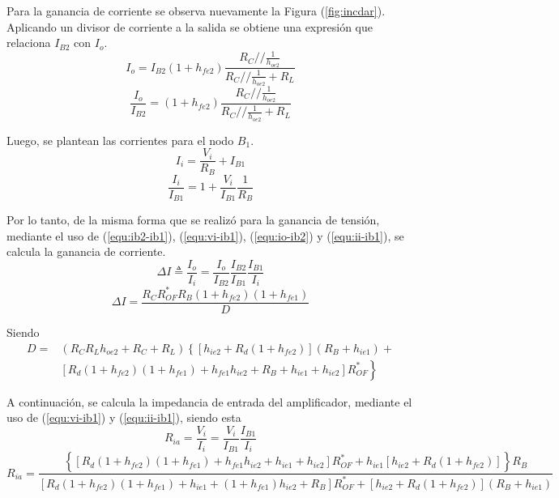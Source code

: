 Para la ganancia de corriente se observa nuevamente la Figura (\ref{fig:incdar}). Aplicando un divisor de corriente a la salida se obtiene una expresión que relaciona $I_{B2}$ con $I_o$.
\begin{equation*}
	I_o = I_{B2} \left( 1 + h_{fe2} \right) \frac{R_C // \frac{1}{h_{oe2}}}{R_C // \frac{1}{h_{oe2}} + R_L}
\end{equation*}
\begin{equation}
	\frac{I_o}{I_{B2}} = \left( 1 + h_{fe2} \right) \frac{R_C // \frac{1}{h_{oe2}}}{R_C // \frac{1}{h_{oe2}} + R_L}
	\label{equ:io-ib2}
\end{equation}

Luego, se plantean las corrientes para el nodo $B_1$.
\begin{equation*}
	I_i = \frac{V_i}{R_B} + I_{B1}
\end{equation*}
\begin{equation}
	\frac{I_i}{I_{B1}} = 1 + \frac{V_i}{I_{B1}} \frac{1}{R_B}
\label{equ:ii-ib1}
\end{equation}

Por lo tanto, de la misma forma que se realizó para la ganancia de tensión, mediante el uso de (\ref{equ:ib2-ib1}), (\ref{equ:vi-ib1}), (\ref{equ:io-ib2}) y (\ref{equ:ii-ib1}), se calcula la ganancia de corriente.
\begin{equation*}
	\Delta I \triangleq \frac{I_o}{I_i} = \frac{I_o}{I_{B2}} \frac{I_{B2}}{I_{B1}} \frac{I_{B1}}{I_i}
\end{equation*}
\begin{equation}
	\Delta I = \frac { R_C R_{OF}^* R_B \left( 1+h_{fe2} \right) \left( 1+h_{fe1} \right)}{D}
\end{equation}

Siendo
\begin{equation}
\begin{split}
D = & \left( R_C R_L h_{oe2}+R_C+R_L \right)  \left\lbrace \left[ h_{ie2} + R_d \left( 1+h_{fe2} \right) \right] \left( R_B+h_{ie1} \right) + \right. \\
& \left. \left[ R_d \left( 1+h_{fe2} \right)  \left( 1+h_{fe1} \right) + h_{fe1} h_{ie2} + R_B + h_{ie1} + h_{ie2} \right] R_{OF}^* \right\rbrace
\end{split}
\end{equation}

A continuación, se calcula la impedancia de entrada del amplificador, mediante el uso de (\ref{equ:vi-ib1}) y (\ref{equ:ii-ib1}), siendo esta
\begin{equation*}
	R_{ia} = \frac{V_i}{I_i} =  \frac{V_i}{I_{B1}}\frac{I_{B1}}{I_i}
\end{equation*}
\begin{equation}
R_{ia} = \frac{\left\lbrace  \left[ R_{d} \left( 1+h_{fe2} \right) \left( 1+h_{fe1} \right) + h_{fe1}h_{ie2} + h_{ie1} + h_{ie2} \right] R_{OF}^* + h_{ie1} \left[ h_{ie2} + R_{d} \left( 1 + h_{fe2} \right) \right] \right\rbrace R_{B}}{\left[ R_{d} \left( 1+h_{fe2} \right) \left( 1 + h_{fe1} \right) + h_{ie1} + \left( 1 + h_{fe1} \right) h_{ie2} + R_{B} \right] R_{OF}^* + \left[ h_{ie2} + R_{d} \left( 1 + h_{fe2} \right) \right] \left( R_{B} + h_{ie1} \right)}
\end{equation}

